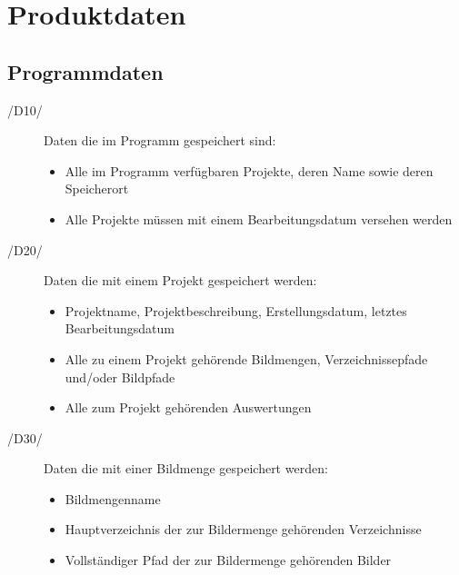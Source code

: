 \section{Produktdaten}

\subsection{Programmdaten}

\label{subsec:programmdaten}

\begin{description}
	
	\item[/D10/] Daten die im Programm gespeichert sind:
	
	\begin{itemize} 
			
			\item Alle im Programm verfügbaren Projekte, deren Name sowie deren Speicherort
	
			\item Alle Projekte müssen mit einem Bearbeitungsdatum versehen werden
	
	\end{itemize}

	\item[/D20/] Daten die mit einem Projekt gespeichert werden:
	
	\begin{itemize}
		
		\item Projektname, Projektbeschreibung, Erstellungsdatum, letztes Bearbeitungsdatum
		
		\item Alle zu einem Projekt gehörende Bildmengen, Verzeichnissepfade und/oder Bildpfade
		
		\item Alle zum Projekt gehörenden Auswertungen
	
	\end{itemize}

	\item[/D30/] Daten die mit einer Bildmenge gespeichert werden:
	
	\begin{itemize}
	
		\item Bildmengenname
		
		\item Hauptverzeichnis der zur Bildermenge gehörenden Verzeichnisse
		
		\item Vollständiger Pfad der zur Bildermenge gehörenden Bilder
		

\end{itemize}
\end{description}
